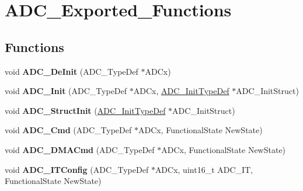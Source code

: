 \hypertarget{group__ADC__Exported__Functions}{
\section{ADC\_\-Exported\_\-Functions}
\label{group__ADC__Exported__Functions}
}
\subsection*{Functions}
\begin{DoxyCompactItemize}
\item 
\hypertarget{group__ADC__Exported__Functions_ga31fa6bc09de17125e9db2830ce77c09b}{
void {\bfseries ADC\_\-DeInit} (ADC\_\-TypeDef $\ast$ADCx)}
\label{group__ADC__Exported__Functions_ga31fa6bc09de17125e9db2830ce77c09b}

\item 
\hypertarget{group__ADC__Exported__Functions_gabbab6038cf8691404350625e477254f9}{
void {\bfseries ADC\_\-Init} (ADC\_\-TypeDef $\ast$ADCx, \hyperlink{structADC__InitTypeDef}{ADC\_\-InitTypeDef} $\ast$ADC\_\-InitStruct)}
\label{group__ADC__Exported__Functions_gabbab6038cf8691404350625e477254f9}

\item 
\hypertarget{group__ADC__Exported__Functions_ga6c6e754d1d0a98d56e465efaf73272ec}{
void {\bfseries ADC\_\-StructInit} (\hyperlink{structADC__InitTypeDef}{ADC\_\-InitTypeDef} $\ast$ADC\_\-InitStruct)}
\label{group__ADC__Exported__Functions_ga6c6e754d1d0a98d56e465efaf73272ec}

\item 
\hypertarget{group__ADC__Exported__Functions_ga40882d399e3371755ed610c1134e634e}{
void {\bfseries ADC\_\-Cmd} (ADC\_\-TypeDef $\ast$ADCx, FunctionalState NewState)}
\label{group__ADC__Exported__Functions_ga40882d399e3371755ed610c1134e634e}

\item 
\hypertarget{group__ADC__Exported__Functions_gac5881d5995818001584b27b137a8dbcb}{
void {\bfseries ADC\_\-DMACmd} (ADC\_\-TypeDef $\ast$ADCx, FunctionalState NewState)}
\label{group__ADC__Exported__Functions_gac5881d5995818001584b27b137a8dbcb}

\item 
\hypertarget{group__ADC__Exported__Functions_gad4c84b54b539944f555488bf979f82b6}{
void {\bfseries ADC\_\-ITConfig} (ADC\_\-TypeDef $\ast$ADCx, uint16\_\-t ADC\_\-IT, FunctionalState NewState)}
\label{group__ADC__Exported__Functions_gad4c84b54b539944f555488bf979f82b6}


\end{DoxyCompactItemize}
